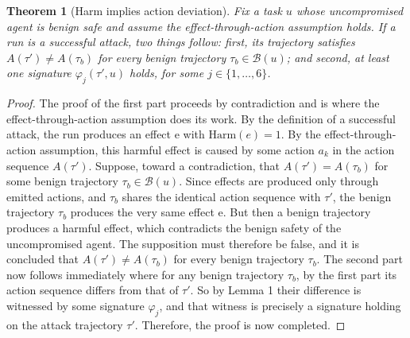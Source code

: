 \documentclass[journal]{IEEEtran}
\newtheorem{theorem}{Theorem}
\theoremstyle{remark}
\begin{document}
\begin{theorem}[Harm implies action deviation]
Fix a task $u$ whose uncompromised agent is benign safe and assume the effect-through-action assumption holds. If a run is a successful attack, two things follow: first, its trajectory satisfies $A(\tau')\neq A(\tau_b)$ for every benign trajectory $\tau_b\in\mathcal{B}(u)$; and second, at least one signature $\varphi_j(\tau',u)$ holds, for some $j\in\{1,\ldots,6\}$.
\end{theorem}

\begin{proof}
The proof of the first part proceeds by contradiction and is where the effect-through-action assumption does its work. By the definition of a successful attack, the run produces an effect e with $\mathrm{Harm}(e)=1$. By the effect-through-action assumption, this harmful effect is caused by some action $a_k$ in the action sequence $A(\tau')$. Suppose, toward a contradiction, that $A(\tau')=A(\tau_b)$ for some benign trajectory $\tau_b\in\mathcal{B}(u)$. Since effects are produced only through emitted actions, and $\tau_b$ shares the identical action sequence with $\tau'$, the benign trajectory $\tau_b$ produces the very same effect e. But then a benign trajectory produces a harmful effect, which contradicts the benign safety of the uncompromised agent. The supposition must therefore be false, and it is concluded that $A(\tau')\neq A(\tau_b)$ for every benign trajectory $\tau_b$. The second part now follows immediately where for any benign trajectory $\tau_b$, by the first part its action sequence differs from that of $\tau'$. So by Lemma 1 their difference is witnessed by some signature $\varphi_j$, and that witness is precisely a signature holding on the attack trajectory $\tau'$. Therefore, the proof is now completed.
\end{proof}
\end{document}
